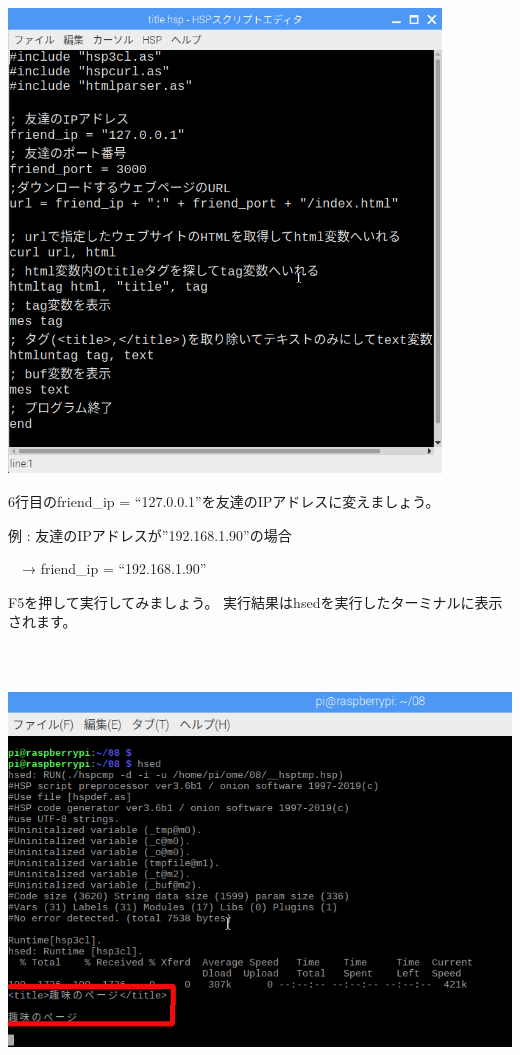 \documentclass[a4paper,12pt,dvipdfmx]{jarticle}
\begin{document}
\begin{center}
\includegraphics[width=11.472cm,height=12.312cm]{textbook-img014.png}

\end{center}

\bigskip


\bigskip

\clearpage
6行目のfriend\_ip =
“127.0.0.1”を友達のIPアドレスに変えましょう。


例 : 友達のIPアドレスが”192.168.1.90”の場合

\ \ → friend\_ip = “192.168.1.90”

F5を押して実行してみましょう。
実行結果はhsedを実行したターミナルに表示されます。



\begin{center}
\includegraphics[width=15.411cm,height=11.841cm]{textbook-img015.png}

\end{center}
\end{document}
